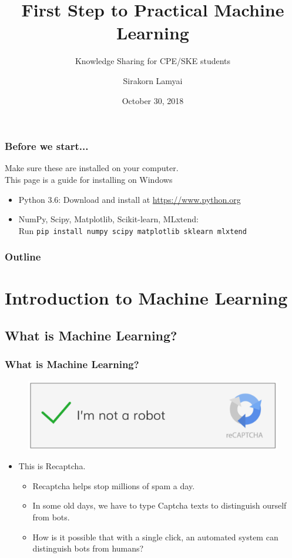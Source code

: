 \documentclass[aspectratio=169]{beamer}
\title{First Step to Practical Machine Learning}
\subtitle{Knowledge Sharing for CPE/SKE students}
\author{Sirakorn Lamyai}
\institute{Student, Kasetsart U.}
\date{October 30, 2018}
\begin{document}
\begin{frame}
	\titlepage
\end{frame}

\begin{frame}
	\frametitle{Before we start...}
	Make sure these are installed on your computer.\\
	{\tiny This page is a guide for installing on Windows}

	\begin{itemize}
		\item Python 3.6: Download and install at \url{https://www.python.org}
		\item NumPy, Scipy, Matplotlib, Scikit-learn, MLxtend:\\
		      Run \texttt{pip install numpy scipy matplotlib sklearn mlxtend}
	\end{itemize}
\end{frame}

\begin{frame}
	\frametitle{Outline}
	\tableofcontents
\end{frame}

\section{Introduction to Machine Learning}

\subsection{What is Machine Learning?}

\begin{frame}
	\frametitle{What is Machine Learning?}
	\pause
	\begin{figure}
		\includegraphics[scale=0.4]{imgs/recaptcha.png}
	\end{figure}
	\begin{itemize}
		\pause
		\item This is Recaptcha.
		      \begin{itemize}
			      \pause
			      \item Recaptcha helps stop millions of spam a day.
			            \pause
			      \item In some old days, we have to type Captcha texts to distinguish ourself from bots.
			            \pause
			      \item How is it possible that with a single click, an automated system can distinguish bots from humans?
		      \end{itemize}
	\end{itemize}
\end{frame}
\end{document}
